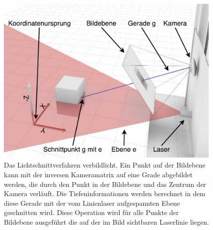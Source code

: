 \begin{figure}
\includegraphics[width=\textwidth]{images/ScannerSchnitt.pdf}
\caption{Das Lichtschnittverfahren verbildlicht. Ein Punkt auf der Bildebene kann mit der inversen Kameramatrix auf eine Grade abgebildet werden, die durch den Punkt in der Bildebene und das Zentrum der Kamera verläuft. Die Tiefeninformationen werden berechnet in dem diese Gerade mit der vom Linienlaser aufgespannten Ebene geschnitten wird. Diese Operation wird für alle Punkte der Bildebene ausgeführt die auf der im Bild sichtbaren Laserlinie liegen.}\label{fig:scanSchnitt}
\end{figure}
